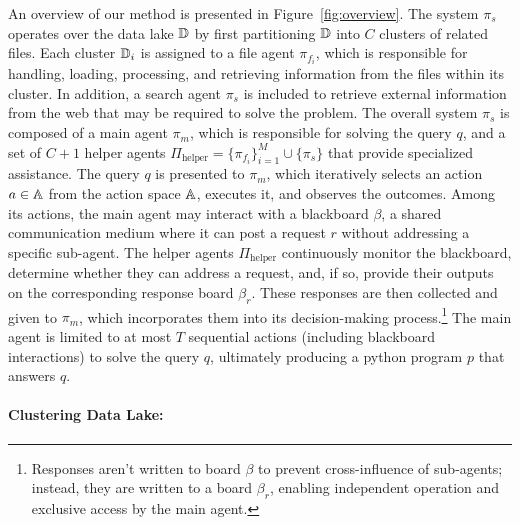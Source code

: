 An overview of our method is presented in Figure~\ref{fig:overview}. The system $\pi_{s}$ operates over the data lake ${\mathbb{D}}$ by first partitioning ${\mathbb{D}}$ into $C$ clusters of related files. Each cluster ${\mathbb{D}}_i$ is assigned to a file agent $\pi_{f_i}$, which is responsible for handling, loading, processing, and retrieving information from the files within its cluster. In addition, a search agent $\pi_{s}$ is included to retrieve external information from the web that may be required to solve the problem. The overall system $\pi_{s}$ is composed of a main agent $\pi_{m}$, which is responsible for solving the query $q$, and a set of $C+1$ helper agents $\Pi_{\text{helper}} = \{\pi_{f_i}\}_{i=1}^{M} \cup \{\pi_{s}\}$ that provide specialized assistance. The query $q$ is presented to $\pi_{m}$, which iteratively selects an action $a \in {\mathbb{A}}$ from the action space ${\mathbb{A}}$, executes it, and observes the outcomes. Among its actions, the main agent may interact with a blackboard $\beta$, a shared communication medium where it can post a request $r$ without addressing a specific sub-agent. The helper agents $\Pi_{\text{helper}}$ continuously monitor the blackboard, determine whether they can address a request, and, if so, provide their outputs on the corresponding response board $\beta_{r}$. These responses are then collected and given to $\pi_{m}$, which incorporates them into its decision-making process.\footnote{Responses aren't written to board $\beta$ to prevent cross-influence of sub-agents; instead, they are written to a board $\beta_{r}$, enabling independent operation and exclusive access by the main agent.} The main agent is limited to at most $T$ sequential actions (including blackboard interactions) to solve the query $q$, ultimately producing a python program $p$ that answers $q$.

\paragraph{Clustering Data Lake:} 

